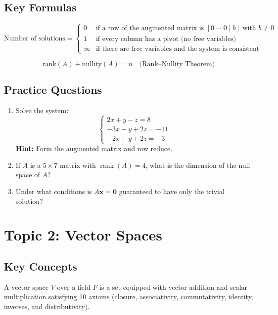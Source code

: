 \documentclass[
    language=english,
    doctype=study-guide,
    institution=none,
]{../../omnilatex}
\begin{document}
\subsection{Key Formulas}

\[
\text{Number of solutions} =
\begin{cases}
    0 & \text{if a row of the augmented matrix is } [0 \;\cdots\; 0 \mid b] \text{ with } b \neq 0 \\
    1 & \text{if every column has a pivot (no free variables)} \\
    \infty & \text{if there are free variables and the system is consistent}
\end{cases}
\]

\[
\text{rank}(A) + \text{nullity}(A) = n \quad \text{(Rank--Nullity Theorem)}
\]

\subsection{Practice Questions}

\begin{enumerate}
    \item Solve the system:
    \[
        \begin{cases}
            2x + y - z = 8 \\
            -3x - y + 2z = -11 \\
            -2x + y + 2z = -3
        \end{cases}
    \]
    \textbf{Hint:} Form the augmented matrix and row reduce.

    \item If $A$ is a $5 \times 7$ matrix with $\operatorname{rank}(A) = 4$, what is the dimension of the null space of $A$?

    \item Under what conditions is $A\mathbf{x} = \mathbf{0}$ guaranteed to have only the trivial solution?
\end{enumerate}

\section{Topic 2: Vector Spaces}

\subsection{Key Concepts}

A vector space $V$ over a field $F$ is a set equipped with vector addition and scalar multiplication satisfying 10 axioms (closure, associativity, commutativity, identity, inverses, and distributivity).
\end{document}
